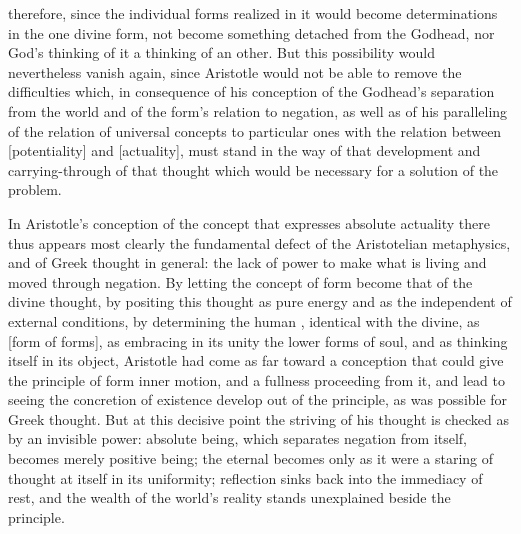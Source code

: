 therefore, since the individual forms realized in it would become
determinations in the one divine form, not become something detached
from the Godhead, nor God's thinking of it a thinking of an other. But
this possibility would nevertheless vanish again, since Aristotle would
not be able to remove the difficulties which, in consequence of his
conception of the Godhead's separation from the world and of the form's
relation to negation, as well as of his paralleling of the relation of
universal concepts to particular ones with the relation between
 [potentiality] and  [actuality], must stand in
the way of that development and carrying-through of that
thought which would be necessary for a solution of the problem.

In Aristotle's conception of the concept that expresses absolute
actuality there thus appears most clearly the fundamental defect of the
Aristotelian metaphysics, and of Greek thought in general: the lack of
power to make what is living and moved through negation. By letting the
concept of form become that of the divine thought, by positing this
thought as pure energy and as the  independent of
external conditions, by determining the human , identical with
the divine, as  [form of forms], as embracing in its
unity the lower forms of soul, and as thinking itself in its object,
Aristotle had come as far toward a conception that could give the
principle of form inner motion, and a fullness proceeding from it, and
lead to seeing the concretion of existence develop out of the principle,
as was possible for Greek thought. But at this decisive point the
striving of his thought is checked as by an invisible power: absolute
being, which separates negation from itself, becomes merely positive
being; the eternal  becomes only as it were a
staring of thought at itself in its uniformity; reflection sinks back
into the immediacy of rest, and the wealth of the world's reality stands
unexplained beside the principle.

